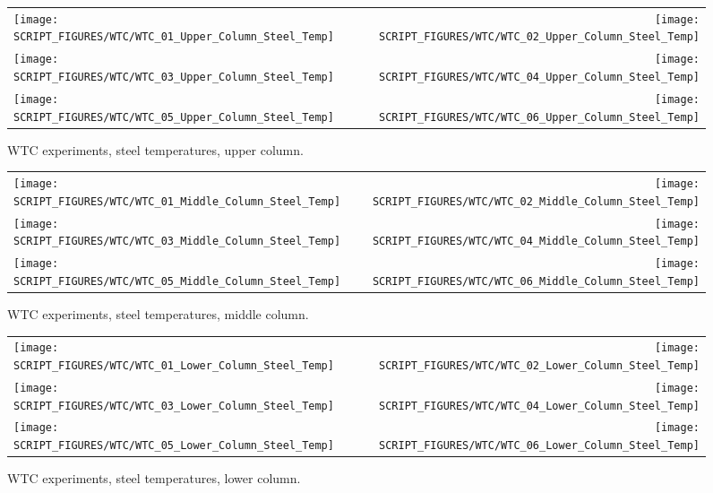 \newpage

\begin{figure}[p]
\begin{tabular*}{\textwidth}{l@{\extracolsep{\fill}}r}
\texttt{[image: SCRIPT\_FIGURES/WTC/WTC\_01\_Upper\_Column\_Steel\_Temp]} &
\texttt{[image: SCRIPT\_FIGURES/WTC/WTC\_02\_Upper\_Column\_Steel\_Temp]} \\
\texttt{[image: SCRIPT\_FIGURES/WTC/WTC\_03\_Upper\_Column\_Steel\_Temp]} &
\texttt{[image: SCRIPT\_FIGURES/WTC/WTC\_04\_Upper\_Column\_Steel\_Temp]} \\
\texttt{[image: SCRIPT\_FIGURES/WTC/WTC\_05\_Upper\_Column\_Steel\_Temp]} &
\texttt{[image: SCRIPT\_FIGURES/WTC/WTC\_06\_Upper\_Column\_Steel\_Temp]}
\end{tabular*}
\caption{WTC experiments, steel temperatures, upper column.}
\label{NIST_WTC_Upper_Column_Steel}
\end{figure}

\begin{figure}[p]
\begin{tabular*}{\textwidth}{l@{\extracolsep{\fill}}r}
\texttt{[image: SCRIPT\_FIGURES/WTC/WTC\_01\_Middle\_Column\_Steel\_Temp]} &
\texttt{[image: SCRIPT\_FIGURES/WTC/WTC\_02\_Middle\_Column\_Steel\_Temp]} \\
\texttt{[image: SCRIPT\_FIGURES/WTC/WTC\_03\_Middle\_Column\_Steel\_Temp]} &
\texttt{[image: SCRIPT\_FIGURES/WTC/WTC\_04\_Middle\_Column\_Steel\_Temp]} \\
\texttt{[image: SCRIPT\_FIGURES/WTC/WTC\_05\_Middle\_Column\_Steel\_Temp]} &
\texttt{[image: SCRIPT\_FIGURES/WTC/WTC\_06\_Middle\_Column\_Steel\_Temp]}
\end{tabular*}
\caption{WTC experiments, steel temperatures, middle column.}
\label{NIST_WTC_Middle_Column_Steel}
\end{figure}

\begin{figure}[p]
\begin{tabular*}{\textwidth}{l@{\extracolsep{\fill}}r}
\texttt{[image: SCRIPT\_FIGURES/WTC/WTC\_01\_Lower\_Column\_Steel\_Temp]} &
\texttt{[image: SCRIPT\_FIGURES/WTC/WTC\_02\_Lower\_Column\_Steel\_Temp]} \\
\texttt{[image: SCRIPT\_FIGURES/WTC/WTC\_03\_Lower\_Column\_Steel\_Temp]} &
\texttt{[image: SCRIPT\_FIGURES/WTC/WTC\_04\_Lower\_Column\_Steel\_Temp]} \\
\texttt{[image: SCRIPT\_FIGURES/WTC/WTC\_05\_Lower\_Column\_Steel\_Temp]} &
\texttt{[image: SCRIPT\_FIGURES/WTC/WTC\_06\_Lower\_Column\_Steel\_Temp]}
\end{tabular*}
\caption{WTC experiments, steel temperatures, lower column.}
\label{NIST_WTC_Lower_Column_Steel}
\end{figure}

